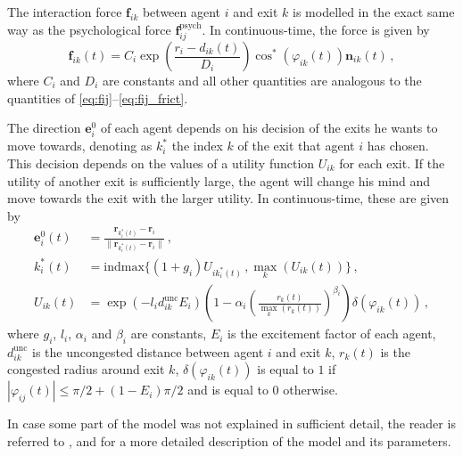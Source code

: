 The interaction force $\bm{f}_{ik}$ between agent $i$ and exit $k$ is modelled in the exact same way as the psychological force $\bm{f}_{ij}^{\mathrm{psych}}$. In continuous-time, the force is given by
\begin{equation} \label{eq:fik}
	\bm{f}_{ik}(t) = C_i \exp\left(\frac{r_{i}-d_{ik}(t)}{D_i}\right) \cos^*(\varphi_{ik}(t)) \bm{n}_{ik}(t) \,,
\end{equation}
where $C_i$ and $D_i$ are constants and all other quantities are analogous to the quantities of \eqref{eq:fij}--\eqref{eq:fij_frict}.

The direction $\bm{e}_i^0$ of each agent depends on his decision of the exits he wants to move towards, denoting as $k_i^*$ the index $k$ of the exit that agent $i$ has chosen. This decision depends on the values of a utility function $U_{ik}$ for each exit. If the utility of another exit is sufficiently large, the agent will change his mind and move towards the exit with the larger utility. In continuous-time, these are given by
\begin{subequations}
\begin{align}
	\bm{e}_i^0(t) & = \frac{\bm{r}_{k_i^*(t)} - \bm{r}_i}{\lVert \bm{r}_{k_i^*(t)} - \bm{r}_i \rVert}  \,, \label{eq:ei} \\
	k_i^*(t) & = \mathrm{indmax}\{ (1+g_i) U_{ik_i^*(t)} \,, \max_k\left(U_{ik}(t)\right) \} \,, \label{eq:ki} \\
	U_{ik}(t) & = \exp\left( -l_i d_{ik}^{\mathrm{unc}} E_i \right) \left(1-\alpha_i\left(\frac{r_k(t)}{\max_k\left(r_k(t)\right)}\right)^{\beta_i}\right) \delta(\varphi_{ik}(t)) \,, \label{eq:Uik}
\end{align}
\end{subequations}
where $g_i$, $l_i$, $\alpha_i$ and $\beta_i$ are constants, $E_i$ is the excitement factor of each agent, $d_{ik}^{\mathrm{unc}}$ is the uncongested distance between agent $i$ and exit $k$, $r_k(t)$ is the congested radius around exit $k$, $\delta(\varphi_{ik}(t))$ is equal to $1$ if $|\varphi_{ij}(t)| \leq \pi/2 + (1-E_i)\pi/2$ and is equal to $0$ otherwise.

In case some part of the model was not explained in sufficient detail, the reader is referred to \cite{Helbing2000}, \cite{Zainuddin2010} and \cite{Wang2016} for a more detailed description of the model and its parameters.
